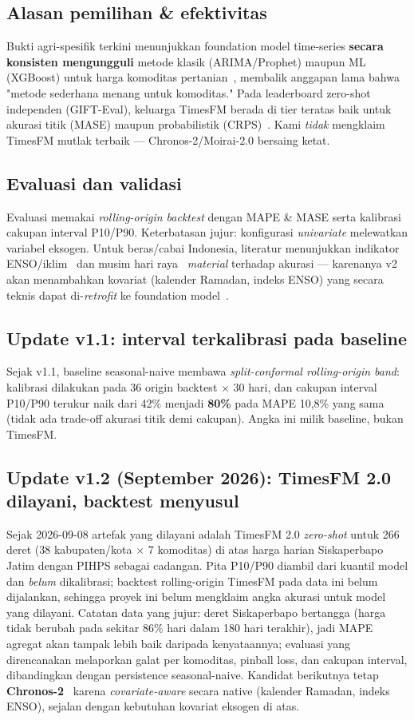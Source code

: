 \documentclass[11pt,a4paper]{article}
\begin{document}
\subsection{Alasan pemilihan \& efektivitas}
Bukti agri-spesifik terkini menunjukkan foundation model time-series \textbf{secara konsisten
mengungguli} metode klasik (ARIMA/Prophet) maupun ML (XGBoost) untuk harga komoditas
pertanian~\cite{wangzhang2026}, membalik anggapan lama bahwa "metode sederhana menang untuk
komoditas." Pada leaderboard zero-shot independen (GIFT-Eval), keluarga TimesFM berada di tier
teratas baik untuk akurasi titik (MASE) maupun probabilistik (CRPS)~\cite{timesfm2023}. Kami
\emph{tidak} mengklaim TimesFM mutlak terbaik --- Chronos-2/Moirai-2.0 bersaing ketat.

\subsection{Evaluasi dan validasi}
Evaluasi memakai \emph{rolling-origin backtest} dengan MAPE \& MASE serta kalibrasi cakupan
interval P10/P90. Keterbatasan jujur: konfigurasi \emph{univariate} melewatkan variabel eksogen.
Untuk beras/cabai Indonesia, literatur menunjukkan indikator ENSO/iklim~\cite{alanshari2025} dan
musim hari raya~\cite{eidpihps2026} \emph{material} terhadap akurasi --- karenanya v2 akan
menambahkan kovariat (kalender Ramadan, indeks ENSO) yang secara teknis dapat di-\emph{retrofit}
ke foundation model~\cite{chronosx2025}.

\subsection{Update v1.1: interval terkalibrasi pada baseline}
Sejak v1.1, baseline seasonal-naive membawa \emph{split-conformal rolling-origin
band}: kalibrasi dilakukan pada 36 origin backtest $\times$ 30 hari, dan cakupan interval P10/P90
terukur naik dari 42\% menjadi \textbf{80\%} pada MAPE 10,8\% yang sama (tidak ada trade-off
akurasi titik demi cakupan). Angka ini milik baseline, bukan TimesFM.

\subsection{Update v1.2 (September 2026): TimesFM 2.0 dilayani, backtest menyusul}
Sejak 2026-09-08 artefak yang dilayani adalah TimesFM 2.0 \emph{zero-shot} untuk 266 deret
(38 kabupaten/kota $\times$ 7 komoditas) di atas harga harian Siskaperbapo Jatim dengan PIHPS
sebagai cadangan. Pita P10/P90 diambil dari kuantil model dan \emph{belum} dikalibrasi; backtest
rolling-origin TimesFM pada data ini belum dijalankan, sehingga proyek ini belum mengklaim angka
akurasi untuk model yang dilayani. Catatan data yang jujur: deret Siskaperbapo bertangga (harga
tidak berubah pada sekitar 86\% hari dalam 180 hari terakhir), jadi MAPE agregat akan tampak
lebih baik daripada kenyataannya; evaluasi yang direncanakan melaporkan galat per komoditas,
pinball loss, dan cakupan interval, dibandingkan dengan persistence seasonal-naive. Kandidat
berikutnya tetap \textbf{Chronos-2}~\cite{chronosx2025} karena \emph{covariate-aware} secara
native (kalender Ramadan, indeks ENSO), sejalan dengan kebutuhan kovariat eksogen di atas.
\end{document}
